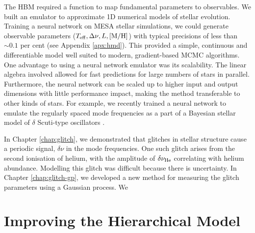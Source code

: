 The HBM required a function to map fundamental parameters to observables. We built an emulator to approximate 1D numerical models of stellar evolution. Training a neural network on MESA stellar simulations, we could generate observable parameters (\({T_\mathrm{eff}}, {\Delta\nu}, L, [\mathrm{M/H}]\)) with typical precisions of less than \(\sim 0.1\) per cent (see Appendix \ref{apx:hmd}). This provided a simple, continuous and differentiable model well suited to modern, gradient-based MCMC algorithms. One advantage to using a neural network emulator was its scalability. The linear algebra involved allowed for fast predictions for large numbers of stars in parallel. Furthermore, the neural network can be scaled up to higher input and output dimensions with little performance impact, making the method transferable to other kinds of stars. For example, we recently trained a neural network to emulate the regularly spaced mode frequencies as a part of a Bayesian stellar model of \(\delta\) Scuti-type oscillators \citep{Scutt.Murphy.ea2023}.

In Chapter \ref{chap:glitch}, we demonstrated that glitches in stellar structure cause a periodic signal, \(\delta\nu\) in the mode frequencies. One such glitch arises from the second ionisation of helium, with the amplitude of \(\delta\nu_{{\mathrm{He}}}\) correlating with helium abundance. Modelling this glitch was difficult because there is uncertainty. In Chapter \ref{chap:glitch-gp}, we developed a new method for measuring the glitch parameters using a Gaussian process. We 


\section{Improving the Hierarchical Model}


